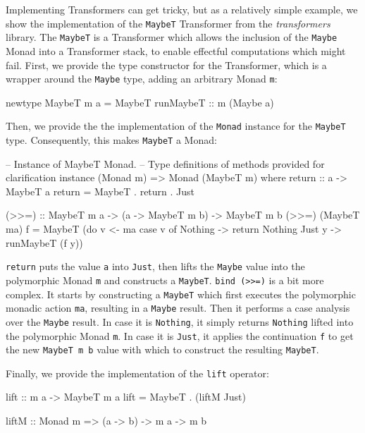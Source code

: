 Implementing Transformers can get tricky, but as a relatively simple example, we show the implementation of the \texttt{MaybeT} Transformer from the \textit{transformers} library. The \texttt{MaybeT} is a Transformer which allows the inclusion of the \texttt{Maybe} Monad into a Transformer stack, to enable effectful computations which might fail. First, we provide the type constructor for the Transformer, which is a wrapper around the \texttt{Maybe} type, adding an arbitrary Monad \texttt{m}:

\begin{HaskellCode}
newtype MaybeT m a = MaybeT { runMaybeT :: m (Maybe a) }
\end{HaskellCode}

Then, we provide the the implementation \cite{allen_haskell_2016} of the \texttt{Monad} instance for the \texttt{MaybeT} type. Consequently, this makes \texttt{MaybeT} a Monad:

\begin{HaskellCode}
-- Instance of MaybeT Monad.
-- Type definitions of methods provided for clarification
instance (Monad m) => Monad (MaybeT m) where
  return :: a -> MaybeT a
  return = MaybeT . return . Just

  (>>=) :: MaybeT m a -> (a -> MaybeT m b) -> MaybeT m b
  (>>=) (MaybeT ma) f = MaybeT (do 
      v <- ma
      case v of
          Nothing -> return Nothing
          Just y  -> runMaybeT (f y))
\end{HaskellCode}

\texttt{return} puts the value \texttt{a} into \texttt{Just}, then lifts the \texttt{Maybe} value into the polymorphic Monad \texttt{m} and constructs a \texttt{MaybeT}. \texttt{bind (>>=)} is a bit more complex. It starts by constructing a \texttt{MaybeT} which first executes the polymorphic monadic action \texttt{ma}, resulting in a \texttt{Maybe} result. Then it performs a case analysis over the \texttt{Maybe} result. In case it is \texttt{Nothing}, it simply returns \texttt{Nothing} lifted into the polymorphic Monad \texttt{m}. In case it is \texttt{Just}, it applies the continuation \texttt{f} to get the new \texttt{MaybeT m b} value with which to construct the resulting \texttt{MaybeT}.

Finally, we provide the implementation of the \texttt{lift} operator:
 
\begin{HaskellCode}
lift :: m a -> MaybeT m a
lift = MaybeT . (liftM Just)

liftM :: Monad m => (a -> b) -> m a -> m b
\end{HaskellCode}


